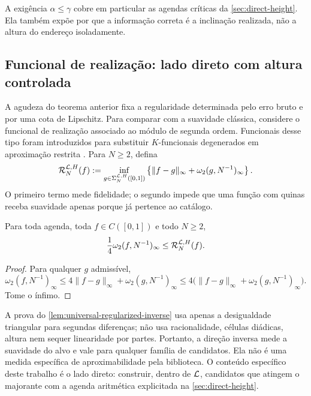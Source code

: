 A exigência $\alpha\le\gamma$ cobre em particular as agendas críticas da
\cref{sec:direct-height}. Ela também expõe por que a informação correta é a inclinação
realizada, não a altura do endereço isoladamente.

\subsection{Funcional de realização: lado direto com altura controlada}

A agudeza do teorema anterior fixa a regularidade determinada pelo erro bruto
e por uma cota de Lipschitz. Para comparar com a suavidade clássica, considere
o funcional de realização associado ao módulo de segunda ordem. Funcionais
desse tipo foram introduzidos para substituir $K$-funcionais degenerados em
aproximação restrita \citep{hristovivanov1990}. Para $N\ge2$, defina
\begin{equation}
 \mathcal R_N^{\mathcal{L},H}(f)
 :=\inf_{g\in\Sigma_N^{\mathcal{L},H}([0,1])}
 \left\{\|f-g\|_\infty+
 \omega_2(g,N^{-1})_\infty\right\}.
 \label{eq:self-roughness-certificate}
\end{equation}
O primeiro termo mede fidelidade; o segundo impede que uma função com quinas
receba suavidade apenas porque já pertence ao catálogo.

\begin{lemma}
\label{lem:universal-regularized-inverse}
Para toda agenda, toda $f\in C([0,1])$ e todo $N\ge2$,
\begin{equation}
 \frac14\omega_2(f,N^{-1})_\infty
 \le \mathcal R_N^{\mathcal{L},H}(f).
 \label{eq:universal-regularized-lower}
\end{equation}
\end{lemma}

\begin{proof}
Para qualquer $g$ admissível,
\[
 \omega_2(f,N^{-1})_\infty
 \le4\|f-g\|_\infty+\omega_2(g,N^{-1})_\infty
 \le4\bigl(\|f-g\|_\infty+\omega_2(g,N^{-1})_\infty\bigr).
\]
Tome o ínfimo.
\end{proof}

\begin{remark}
\label{rem:realization-functional-scope}
A prova do \cref{lem:universal-regularized-inverse} usa apenas a desigualdade
triangular para segundas diferenças; não usa racionalidade, células diádicas,
altura nem sequer linearidade por partes. Portanto, a direção inversa mede a
suavidade do alvo e vale para qualquer família de candidatos. Ela não é uma
medida específica de aproximabilidade pela biblioteca. O conteúdo específico
deste trabalho é o lado direto: construir, dentro de $\mathcal{L}$, candidatos
que atingem o majorante com a agenda aritmética explicitada na
\cref{sec:direct-height}.
\end{remark}

